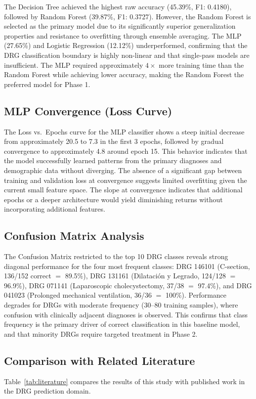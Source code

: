 \documentclass{IEEEtran}
\begin{document}
The Decision Tree achieved the highest raw accuracy (45.39\%, F1: 0.4180), followed by Random Forest (39.87\%, F1: 0.3727). However, the Random Forest is selected as the primary model due to its significantly superior generalization properties and resistance to overfitting through ensemble averaging. The MLP (27.65\%) and Logistic Regression (12.12\%) underperformed, confirming that the DRG classification boundary is highly non-linear and that single-pass models are insufficient. The MLP required approximately $4\times$ more training time than the Random Forest while achieving lower accuracy, making the Random Forest the preferred model for Phase 1.

\subsection{MLP Convergence (Loss Curve)}
The Loss vs.\ Epochs curve for the MLP classifier shows a steep initial decrease from approximately 20.5 to 7.3 in the first 3 epochs, followed by gradual convergence to approximately 4.8 around epoch 15. This behavior indicates that the model successfully learned patterns from the primary diagnoses and demographic data without diverging. The absence of a significant gap between training and validation loss at convergence suggests limited overfitting given the current small feature space. The slope at convergence indicates that additional epochs or a deeper architecture would yield diminishing returns without incorporating additional features.

\subsection{Confusion Matrix Analysis}
The Confusion Matrix restricted to the top 10 DRG classes reveals strong diagonal performance for the four most frequent classes: DRG 146101 (C-section, 136/152 correct $=$ 89.5\%), DRG 131161 (Dilataci\'on y Legrado, 124/128 $=$ 96.9\%), DRG 071141 (Laparoscopic cholecystectomy, 37/38 $=$ 97.4\%), and DRG 041023 (Prolonged mechanical ventilation, 36/36 $=$ 100\%). Performance degrades for DRGs with moderate frequency (30--80 training samples), where confusion with clinically adjacent diagnoses is observed. This confirms that class frequency is the primary driver of correct classification in this baseline model, and that minority DRGs require targeted treatment in Phase 2.

\subsection{Comparison with Related Literature}
Table~\ref{tab:literature} compares the results of this study with published work in the DRG prediction domain.
\end{document}
